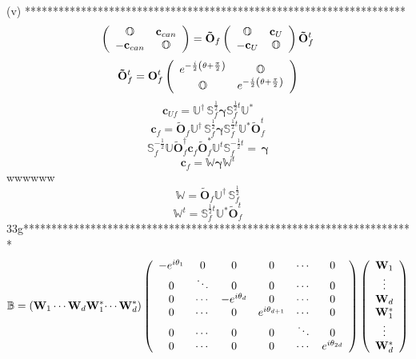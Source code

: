 \documentclass[aps,preprint]{revtex4}%
\begin{document}
(v) ********************************************************************%
\[
\left(
\begin{array}
[c]{cc}%
\mathbb{O} & \mathbf{c}_{can}\\
-\mathbf{c}_{can} & \mathbb{O}%
\end{array}
\right)  =\mathbf{\tilde{O}}_{f}\left(
\begin{array}
[c]{cc}%
\mathbb{O} & \mathbf{c}_{U}\\
-\mathbf{c}_{U} & \mathbb{O}%
\end{array}
\right)  \mathbf{\tilde{O}}_{f}^{t}%
\]%
\[
\mathbf{\tilde{O}}_{f}^{t}=\mathbf{O}_{f}^{t}\left(
\begin{array}
[c]{cc}%
e^{-\frac{i}{2}\left(  \mathbf{\theta+}\frac{\pi}{2}\right)  } & \mathbb{O}\\
\mathbb{O} & e^{-\frac{i}{2}\left(  \mathbf{\theta+}\frac{\pi}{2}\right)  }%
\end{array}
\right)
\]%
\[
\mathbf{c}_{Uf}=\mathbb{U}^{\dagger}\,\mathbb{S}_{f}^{\frac{1}{2}%
}\mathbf{\gamma}\mathbb{S}_{f}^{\frac{1}{2}t}\mathbb{U}^{\ast}%
\]%
\[
\mathbf{c}_{f}=\mathbf{\tilde{O}}_{f}\mathbb{U}^{\dagger}\,\mathbb{S}%
_{f}^{\frac{1}{2}}\mathbf{\gamma}\mathbb{S}_{f}^{\frac{1}{2}t}\mathbb{U}%
^{\ast}\mathbf{\tilde{O}}_{f}^{t}%
\]%
\[
\mathbb{S}_{f}^{-\frac{1}{2}}\mathbb{U}\mathbf{\tilde{O}}_{f}^{\dagger
}\mathbf{c}_{f}\mathbf{\tilde{O}}_{f}^{\ast}\mathbb{U}^{t}\mathbb{S}%
_{f}^{-\frac{1}{2}t}=\,\mathbf{\gamma}%
\]%
\[
\mathbf{c}_{f}=\mathbb{W}\mathbf{\gamma}\mathbb{W}^{t}%
\]
wwwwww%
\[
\mathbb{W}=\mathbf{\tilde{O}}_{f}\mathbb{U}^{\dagger}\,\mathbb{S}_{f}%
^{\frac{1}{2}}%
\]%
\[
\mathbb{W}^{t}=\mathbb{S}_{f}^{\frac{1}{2}t}\mathbb{U}^{\ast}\mathbf{\tilde
{O}}_{f}^{t}%
\]
33g**********************************************************************%
\[
\mathbb{B}=\left(  \mathbf{W}_{1}\cdots\mathbf{W}_{d}\mathbf{W}_{1}^{\ast
}\mathbf{\cdots W}_{d}^{\ast}\right)  \left(
\begin{array}
[c]{cccccc}%
-e^{i\theta_{1}} & 0 & 0 & 0 & \cdots & 0\\
0 & \ddots & 0 & 0 & \cdots & 0\\
0 & \cdots & -e^{i\theta_{d}} & 0 & \cdots & 0\\
0 & \cdots & 0 & e^{i\theta_{d+1}} & \cdots & 0\\
0 & \cdots & 0 & 0 & \ddots & 0\\
0 & \cdots & 0 & 0 & \cdots & e^{i\theta_{2d}}%
\end{array}
\right)  \left(
\begin{array}
[c]{c}%
\mathbf{W}_{1}\\
\vdots\\
\mathbf{W}_{d}\\
\mathbf{W}_{1}^{\ast}\\
\vdots\\
\mathbf{W}_{d}^{\ast}%
\end{array}
\right)
\]%
\end{document}
